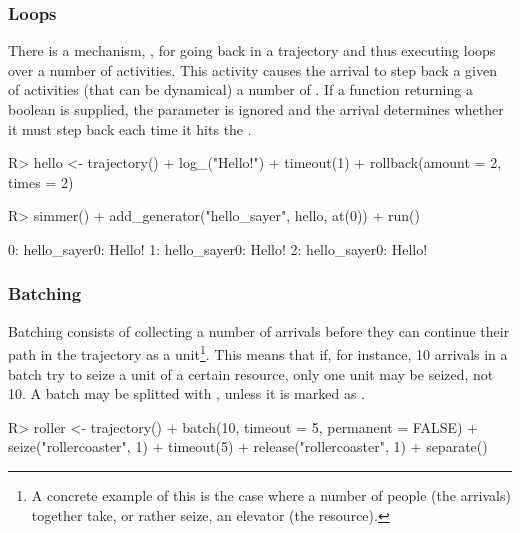 \documentclass[
  nojss]{jss}
\begin{document}
\subsubsection{Loops}\label{loops}

There is a mechanism, , for going back in a trajectory
and thus executing loops over a number of activities. This activity
causes the arrival to step back a given  of activities
(that can be dynamical) a number of . If a 
function returning a boolean is supplied, the  parameter is
ignored and the arrival determines whether it must step back each time
it hits the .

\begin{CodeChunk}
\begin{CodeInput}
R> hello <- trajectory() %
+   log_("Hello!") %
+   timeout(1) %
+   rollback(amount = 2, times = 2)
\end{CodeInput}
\end{CodeChunk}

\begin{CodeChunk}
\begin{CodeInput}
R> simmer() %
+   add_generator("hello_sayer", hello, at(0)) %
+   run() %
\end{CodeInput}
\begin{CodeOutput}
0: hello_sayer0: Hello!
1: hello_sayer0: Hello!
2: hello_sayer0: Hello!
\end{CodeOutput}
\end{CodeChunk}

\subsubsection{Batching}\label{batching}

Batching consists of collecting a number of arrivals before they can
continue their path in the trajectory as a unit\footnote{A concrete
  example of this is the case where a number of people (the arrivals)
  together take, or rather seize, an elevator (the resource).}. This
means that if, for instance, 10 arrivals in a batch try to seize a unit
of a certain resource, only one unit may be seized, not 10. A batch may
be splitted with , unless it is marked as
.

\begin{CodeChunk}
\begin{CodeInput}
R> roller <- trajectory() %
+   batch(10, timeout = 5, permanent = FALSE) %
+   seize("rollercoaster", 1) %
+   timeout(5) %
+   release("rollercoaster", 1) %
+   separate()
\end{CodeInput}
\end{CodeChunk}
\end{document}
